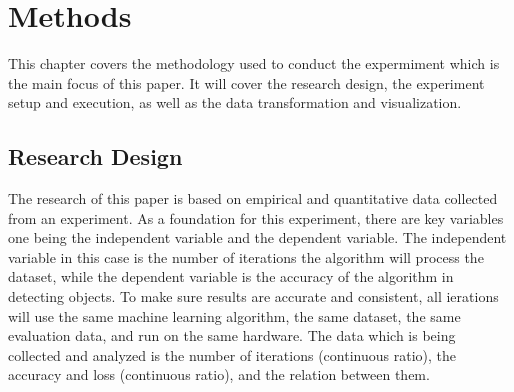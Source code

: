 \section{Methods}
This chapter covers the methodology used to conduct the expermiment which is the main focus of this paper.
It will cover the research design, the experiment setup and execution, as well as the data transformation 
and visualization.

\subsection{Research Design}
The research of this paper is based on empirical and quantitative data collected from an experiment.
As a foundation for this experiment, there are key variables one being the independent variable and the 
dependent variable. The independent variable in this case is the number of iterations the algorithm will
process the dataset, while the dependent variable is the accuracy of the algorithm in detecting objects.
To make sure results are accurate and consistent, all ierations will use the same machine learning algorithm,
the same dataset, the same evaluation data, and run on the same hardware.
The data which is being collected and analyzed is the number of iterations (continuous ratio), the accuracy
and loss (continuous ratio), and the relation between them.

